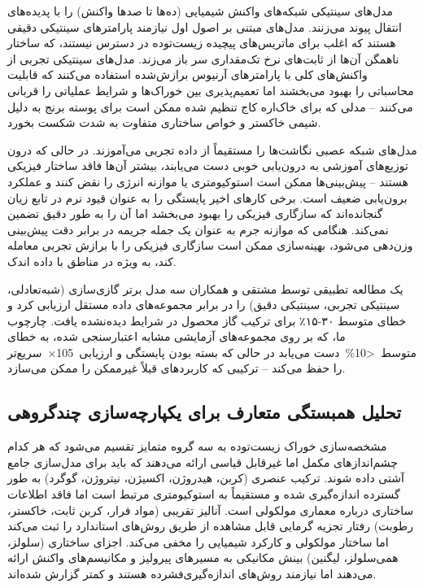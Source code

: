 \documentclass[12pt, a4paper]{article}
\begin{document}
مدل‌های سینتیکی شبکه‌های واکنش شیمیایی (ده‌ها تا صدها واکنش) را با پدیده‌های انتقال پیوند می‌زنند. مدل‌های مبتنی بر اصول اول نیازمند پارامترهای سینتیکی دقیقی هستند که اغلب برای ماتریس‌های پیچیده زیست‌توده در دسترس نیستند، که ساختار ناهمگن آن‌ها از ثابت‌های نرخ تک‌مقداری سر باز می‌زند. مدل‌های سینتیکی تجربی از واکنش‌های کلی با پارامترهای آرنیوس برازش‌شده استفاده می‌کنند که قابلیت محاسباتی را بهبود می‌بخشند اما تعمیم‌پذیری بین خوراک‌ها و شرایط عملیاتی را قربانی می‌کنند – مدلی که برای خاک‌اره کاج تنظیم شده ممکن است برای پوسته برنج به دلیل شیمی خاکستر و خواص ساختاری متفاوت به شدت شکست بخورد.

مدل‌های شبکه عصبی نگاشت‌ها را مستقیماً از داده تجربی می‌آموزند. در حالی که درون توزیع‌های آموزشی به درون‌یابی خوبی دست می‌یابند، بیشتر آن‌ها فاقد ساختار فیزیکی هستند – پیش‌بینی‌ها ممکن است استوکیومتری یا موازنه انرژی را نقض کنند و عملکرد برون‌یابی ضعیف است. برخی کارهای اخیر پایستگی را به عنوان قیود نرم در تابع زیان گنجانده‌اند که سازگاری فیزیکی را بهبود می‌بخشد اما آن را به طور دقیق تضمین نمی‌کند. هنگامی که موازنه جرم به عنوان یک جمله جریمه در برابر دقت پیش‌بینی وزن‌دهی می‌شود، بهینه‌سازی ممکن است سازگاری فیزیکی را با برازش تجربی معامله کند، به ویژه در مناطق با داده اندک.

یک مطالعه تطبیقی توسط مشتقی و همکاران سه مدل برتر گازی‌سازی (شبه‌تعادلی، سینتیکی تجربی، سینتیکی دقیق) را در برابر مجموعه‌های داده مستقل ارزیابی کرد و خطای متوسط ۳۰-۱۵٪ برای ترکیب گاز محصول در شرایط دیده‌نشده یافت. چارچوب ما، که بر روی مجموعه‌های آزمایشی مشابه اعتبارسنجی شده، به خطای متوسط <10\% دست می‌یابد در حالی که بسته بودن پایستگی و ارزیابی 105× سریع‌تر را حفظ می‌کند – ترکیبی که کاربردهای قبلاً غیرممکن را ممکن می‌سازد.

\subsection{تحلیل همبستگی متعارف برای یکپارچه‌سازی چندگروهی}

مشخصه‌سازی خوراک زیست‌توده به سه گروه متمایز تقسیم می‌شود که هر کدام چشم‌اندازهای مکمل اما غیرقابل قیاسی ارائه می‌دهند که باید برای مدل‌سازی جامع آشتی داده شوند. ترکیب عنصری (کربن، هیدروژن، اکسیژن، نیتروژن، گوگرد) به طور گسترده اندازه‌گیری شده و مستقیماً به استوکیومتری مرتبط است اما فاقد اطلاعات ساختاری درباره معماری مولکولی است. آنالیز تقریبی (مواد فرار، کربن ثابت، خاکستر، رطوبت) رفتار تجزیه گرمایی قابل مشاهده از طریق روش‌های استاندارد را ثبت می‌کند اما ساختار مولکولی و کارکرد شیمیایی را مخفی می‌کند. اجزای ساختاری (سلولز، همی‌سلولز، لیگنین) بینش مکانیکی به مسیرهای پیرولیز و مکانیسم‌های واکنش ارائه می‌دهند اما نیازمند روش‌های اندازه‌گیری‌فشرده هستند و کمتر گزارش شده‌اند.
\end{document}
